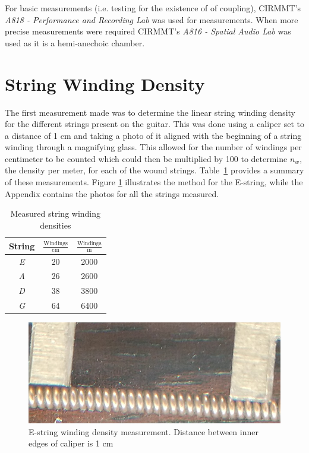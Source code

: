 \documentclass[../main.tex]{subfiles}
\begin{document}
For basic measurements (i.e. testing for the existence of of coupling), CIRMMT's \emph{A818 - Performance and Recording Lab} was used for measurements. When more precise measurements were required CIRMMT's \emph{A816 - Spatial Audio Lab} was used as it is a hemi-anechoic chamber.

\section{String Winding Density}
The first measurement made was to determine the linear string winding density for the different strings present on the guitar. This was done using a caliper set to a distance of 1 cm and taking a photo of it aligned with the beginning of a string winding through a magnifying glass. This allowed for the number of windings per centimeter to be counted which could then be multiplied by 100 to determine $n_w$, the density per meter, for each of the wound strings. Table~\ref{tab:WindingDensities} provides a summary of these measurements. Figure \ref{fig:EWindings} illustrates the method for the E-string, while the Appendix contains the photos for all the strings measured.

\begin{table}[h]
\centering
    \begin{tabular}{||c|| c| c||} 
        \hline
        String & $\frac{\text{Windings}}{\text{cm}}$ & $\frac{\text{Windings}}{\text{m}}$ \\ [0.5ex] 
        \hline
        \hline
        \emph{E} & 20 & 2000 \\ 
        \hline
        \emph{A} & 26 & 2600 \\
        \hline
        \emph{D} & 38 & 3800 \\ 
        \hline
        \emph{G} & 64 & 6400 \\ 
        \hline
    \end{tabular}
\caption{Measured string winding densities}
\label{tab:WindingDensities}
\end{table}

\begin{figure}[h]
    \centering
    \includegraphics[scale=.75]{./images/pictures/WindingsEZoom.png}
    \caption{E-string winding density measurement. Distance between inner edges of caliper is 1 cm}
    \label{fig:EWindings}
\end{figure}
\end{document}
